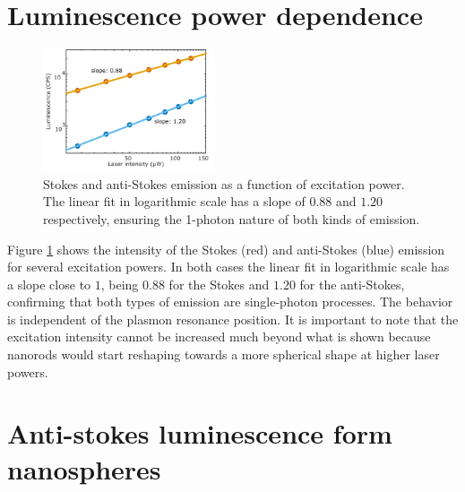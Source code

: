 \documentclass[journal=nalefd,manuscript=letter]{achemso}
\newcommand{\K}{\ensuremath{\,\textrm{K}}}
\newcommand{\nm}{\ensuremath{\,\textrm{nm}}}
\begin{document}
\section{Luminescence power dependence}
\begin{figure}[htp] \centering
\includegraphics[width=0.45\textwidth]{Figures/Supplementary/01_AS_S_in_Log/01_AS_S_in_Log.png}
\caption{Stokes and anti-Stokes emission as a function of excitation power. The
linear fit in logarithmic scale has a slope of $0.88$ and $1.20$ respectively,
ensuring the 1-photon nature of both kinds of emission.}
	\label{fig:Log_Plot}
\end{figure}

Figure \ref{fig:Log_Plot} shows the intensity of the Stokes (red) and
anti-Stokes (blue) emission for several excitation powers. In both cases the
linear fit in logarithmic scale has a slope close to $1$, being $0.88$ for the
Stokes and $1.20$ for the anti-Stokes, confirming that both types of emission
are single-photon processes. The behavior is independent of the plasmon
resonance position. It is important to note that the excitation intensity cannot
be increased much beyond what is shown because nanorods would start reshaping
towards a more spherical shape at higher laser powers.

\section{Anti-stokes luminescence form nanospheres}

 
\end{document}
